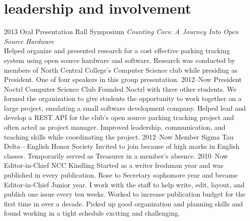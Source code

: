 \documentclass[]{friggeri-cv} %
\begin{document}
\section{leadership and involvement}

\begin{entrylist}
\entry
{2013}
{Oral Presentation}
{Rall Symposium}
{\emph{Counting Cars: A Journey Into Open Source Hardware}\\
Helped organize and presented research for a cost effective parking tracking system using open source hardware and software.
Research was conducted by members of North Central College's Computer Science club while presiding as President.
One of four speakers in this group presentation.}
\entry
{2012--Now}
{President}
{Noctrl Computer Science Club}
{Founded Noctrl with three other students.
We formed the organization to give students the opportunity to work together on a large project, emulating a small software development company.
Helped lead and develop a REST API for the club's open source parking tracking project and often acted as project manager.
Improved leadership, communication, and teaching skills while coordinating the project.}
\entry
{2012--Now}
{Member}
{Sigma Tau Delta---English Honor Society}
{Invited to join because of high marks in English classes. Temporarily served as Treasurer in a member's absence.}
\entry
{2010--Now}
{Editor-in-Chief}
{NCC Kindling}
{Started as a writer freshman year and was published in every publication.
Rose to Secretary sophomore year and became Editor-in-Chief Junior year.
I work with the staff to help write, edit, layout, and publish one issue every ten weeks.
Worked to increase publication budget for the first time in over a decade.
Picked up good organization and planning skills and found working in a tight schedule exciting and challenging.}
\end{entrylist}

%
%
\end{document}
